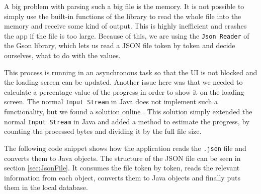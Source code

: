 \documentclass[12p]{article}
\begin{document}
    A big problem with parsing such a big file is the memory. It is not possible to simply use the built-in functions of the library to read the whole file into the memory and receive some kind of output. This is highly inefficient and crashes the app if the file is too large. Because of this, we are using the \texttt{Json Reader} of the Gson library, which lets us read a JSON file token by token and decide ourselves, what to do with the values.
    
    This process is running in an asynchronous task so that the UI is not blocked and the loading screen can be updated. Another issue here was that we needed to calculate a percentage value of the progress in order to show it on the loading screen. The normal \texttt{Input Stream} in Java does not implement such a functionality, but we found a solution online \cite{ProgressInputStream}. This solution simply extended the normal \texttt{Input Stream} in Java and added a method to estimate the progress, by counting the processed bytes and dividing it by the full file size.
    
    The following code snippet shows how the application reads the \texttt{.json} file and converts them to Java objects. The structure of the JSON file can be seen in section \ref{sec:JsonFile}. It consumes the file token by token, reads the relevant information from each object, converts them to Java objects and finally puts them in the local database.
    
\end{document}
